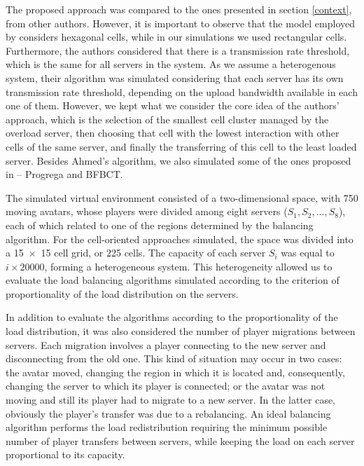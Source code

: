 \documentclass[acmtocl]{acmtrans2m}
\begin{document}
The proposed approach was compared to the ones presented in section \ref{context}, from other authors. However, it is important to observe that the model employed by \cite{ahmed2008mol} considers hexagonal cells, while in our simulations we used rectangular cells. Furthermore, the authors considered that there is a transmission rate threshold, which is the same for all servers in the system. As we assume a heterogenous system, their algorithm was simulated considering that each server has its own transmission rate threshold, depending on the upload bandwidth available in each one of them. However, we kept what we consider the core idea of the authors' approach, which is the selection of the smallest cell cluster managed by the overload server, then choosing that cell with the lowest interaction with other cells of the same server, and finally the transferring of this cell to the least loaded server. Besides Ahmed's algorithm, we also simulated some of the ones proposed in \cite{bezerra2009lbs} -- Progrega and BFBCT.

The simulated virtual environment consisted of a two-dimensional space, with 750 moving avatars, whose players were divided among eight servers ($S_1, S_2, ..., S_8$), each of which related to one of the regions determined by the balancing algorithm. For the cell-oriented approaches simulated, the space was divided into a \mbox{15 $\times$ 15} cell grid, or 225 cells. The capacity of each server $S_i$ was equal to $i \times 20000$, forming a heterogeneous system. This heterogeneity allowed us to evaluate the load balancing algorithms simulated according to the criterion of proportionality of the load distribution on the servers.

In addition to evaluate the algorithms according to the proportionality of the load distribution, it was also considered the number of player migrations between servers. Each migration involves a player connecting to the new server and disconnecting from the old one. This kind of situation may occur in two cases: the avatar moved, changing the region in which it is located and, consequently, changing the server to which its player is connected; or the avatar was not moving and still its player had to migrate to a new server. In the latter case, obviously the player's transfer was due to a rebalancing. An ideal balancing algorithm performs the load redistribution requiring the minimum possible number of player transfers between servers, while keeping the load on each server proportional to its capacity.
\end{document}

